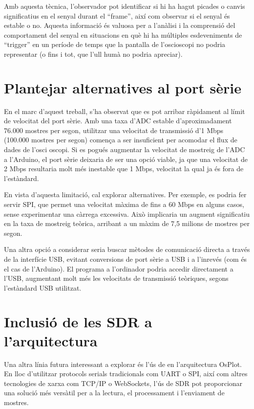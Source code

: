 \documentclass{tfgitic}[2023/06/30]
\begin{document}
Amb aquesta tècnica, l'observador pot identificar si hi ha hagut
picades o canvis significatius en el senyal durant el ``frame'', així
com observar si el senyal és estable o no. Aquesta informació és
valuosa per a l'anàlisi i la comprensió del comportament del senyal en
situacions en què hi ha múltiples esdeveniments de ``trigger'' en un
període de temps que la pantalla de l'osci\lgem oscopi no podria
representar (o fins i tot, que l'ull humà no podria apreciar).

\section{Plantejar alternatives al port sèrie}

En el marc d'aquest treball, s'ha observat que es pot arribar
ràpidament al límit de velocitat del port sèrie. Amb una taxa d'ADC
estable d'aproximadament 76.000 mostres per segon, utilitzar una
velocitat de transmissió d'1 Mbps (100.000 mostres per segon) comença
a ser insuficient per acomodar el flux de dades de l'osci\lgem
oscopi. Si es pogués augmentar la velocitat de mostreig de l'ADC a
l'Arduino, el port sèrie deixaria de ser una opció viable, ja que una
velocitat de 2 Mbps resultaria molt més inestable que 1 Mbps,
velocitat la qual ja és fora de l'estàndard.

En vista d'aquesta limitació, cal explorar alternatives. Per exemple,
es podria fer servir SPI, que permet una velocitat màxima de fins a 60
Mbps en alguns casos, sense experimentar una càrrega excessiva. Això
implicaria un augment significatiu en la taxa de mostreig teòrica,
arribant a un màxim de 7,5 milions de mostres per segon.

Una altra opció a considerar seria buscar mètodes de comunicació
directa a través de la interfície USB, evitant conversions de port
sèrie a USB i a l'inrevés (com és el cas de l'Arduino). El programa a
l'ordinador podria accedir directament a l'USB, augmentant molt més
les velocitats de transmissió teòriques, segons l'estàndard USB
utilitzat.

\section{Inclusió de les SDR a l'arquitectura}

Una altra línia futura interessant a explorar és l'ús de \cite[Ràdio
  Definida per Software]{viqui-sdr} en l'arquitectura OsPlot. En lloc
d'utilitzar protocols serials tradicionals com UART o SPI, així com
altres tecnologies de xarxa com TCP/IP o WebSockets, l'ús de SDR pot
proporcionar una solució més versàtil per a la lectura, el
processament i l'enviament de mostres.
\end{document}
